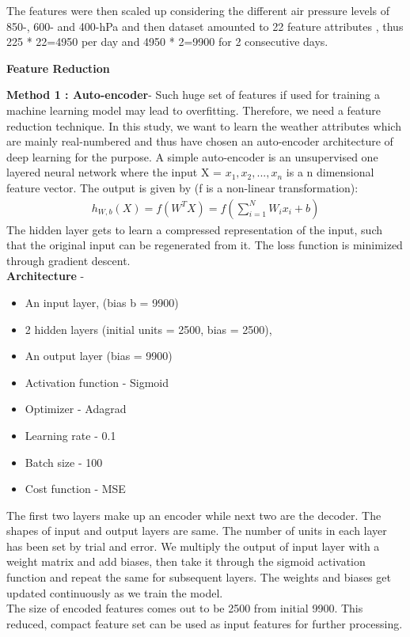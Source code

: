 \documentclass[11pt,a4paper]{article}
\begin{document}
The features were then scaled up considering the different air pressure levels of  850-, 600- and 400-hPa and then dataset amounted to 22 feature attributes , thus 225 * 22=4950 per day and 4950 * 2=9900 for 2 consecutive days.

\medskip

\begin{center}
\textbf{Feature Reduction}
\end{center}

\textbf{Method 1 : Auto-encoder}- Such huge set of features if used for training a machine learning model may lead to overfitting. Therefore, we need a feature reduction technique. In this study, we want to learn the weather attributes which are mainly real-numbered and thus have chosen an auto-encoder architecture of deep learning for the purpose\cite{AE}. A simple auto-encoder is an unsupervised one layered neural network where the input X = $x_1, x_2, ..., x_n$ is a n dimensional feature vector. The output is
given by (f is a non-linear transformation):
\begin{align*}
h_{W,b}(X) = f(W^TX) = f(\sum_{i=1}^N W_ix_i + b)
\end{align*}
The hidden layer gets to learn a compressed representation of the input, such that the original input can be regenerated from it. The loss function is minimized through gradient descent. \\

\textbf{Architecture} -
\begin{itemize}
\item An input layer, (bias b = 9900)
\item 2 hidden layers (initial units = 2500, bias = 2500),
\item An output layer (bias = 9900)
\item Activation function - Sigmoid
\item Optimizer - Adagrad
\item Learning rate - 0.1
\item Batch size - 100
\item Cost function - MSE
\end{itemize}
The first two layers make up an encoder while next two are the decoder. The shapes of input and output layers are same. The number of units in each layer has been set by trial and error. We multiply the output of input layer with a weight matrix and add biases, then take it through the sigmoid activation function and repeat the same for subsequent layers. The weights and biases get updated continuously as we train the model.\\
The size of encoded features comes out to be 2500 from initial 9900. This reduced, compact feature set can be used as input features for further processing. 
\end{document}
